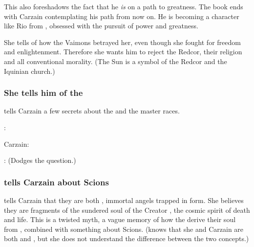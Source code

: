 This also foreshadows the fact that he \emph{is} on a path to greatness. The book ends with Carzain contemplating his path from now on. He is becoming a character like Rio from \JuukenSentaiGekiranger, obsessed with the pursuit of power and greatness.


She tells of how the  Vaimons betrayed her, even though she fought for freedom and enlightenment. 
Therefore she wants him to reject the Redcor, their religion and all conventional morality. 
(The Sun is a symbol of the Redcor and the Iquinian church.) 






\subsubsection{She tells him of the \Feud}
\Belzir{} tells Carzain a few secrets about the \feud{} and the master races. 

\Belzir: 

Carzain: 

\Belzir: (Dodges the question.) 





\subsubsection{\Belzir tells Carzain about Scions}
\Belzir tells Carzain that they are both , immortal angels trapped in \human form.
She believes they are fragments of the sundered soul of the Creator \Dragon, the cosmic spirit of death and life.
This is a twisted myth, a vague memory of how the \satharioth derive their soul from \Nexagglachel, combined with something about Scions. 
(\Belzir knows that she and Carzain are both \satharioth and \malachim, but she does not understand the difference between the two concepts.)

